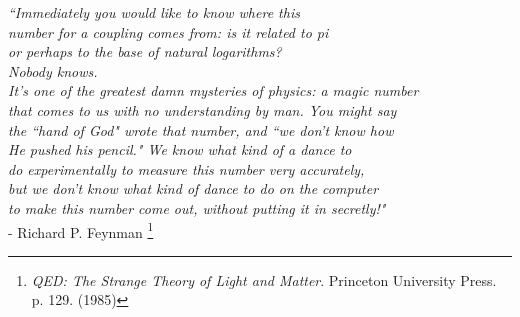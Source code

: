 \vfill

\begin{flushright}
\emph{
``Immediately you would like to know where this \\
number for a coupling comes from: is it related to pi\\
or perhaps to the base of natural logarithms? \\
Nobody knows.\\
It's one of the greatest damn mysteries of physics: a magic number \\
that comes to us with no understanding by man. You might say \\
the ``hand of God" wrote that number, and ``we don't know how\\
He pushed his pencil." We know what kind of a dance to\\
do experimentally to measure this number very accurately,\\
but we don't know what kind of dance to do on the computer\\
to make this number come out, without putting it in secretly!"}\\
- Richard P.
Feynman \footnote{\emph{QED: The Strange Theory of Light and Matter}.
	Princeton University Press.	p.	129.	(1985)}
\end{flushright}




	 



